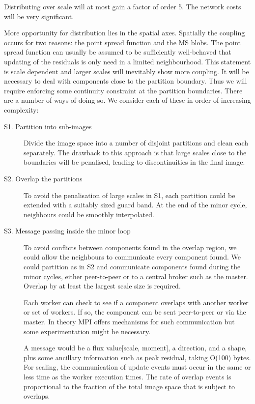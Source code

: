 \documentclass[11pt,a4paper,variablewidth]{article}
\begin{document}
Distributing over scale will at most gain a factor of order 5. The network costs will be very significant. 

More opportunity for distribution lies in the spatial axes. Spatially the coupling occurs for two reasons: the point spread function and the MS blobs. The point spread function can usually be assumed to be sufficiently well-behaved that updating of the residuals is only need in a limited neighbourhood. This statement is scale dependent and larger scales will inevitably show more coupling. It will be necessary to deal with components close to the partition boundary. Thus we will require enforcing some continuity constraint at the partition boundaries. There are a number of ways of doing so. We consider each of these in order of increasing complexity:

\begin{description}
\item[S1. Partition into sub-images]

Divide the image space into a number of disjoint partitions and clean each separately. The drawback to this approach is that large scales close to the boundaries will be penalised, leading to discontinuities in the final image.

\item[S2. Overlap the partitions]

To avoid the penalisation of large scales in S1, each partition could be extended with a suitably sized guard band. At the end of the minor cycle, neighbours could be smoothly interpolated. 

\item[S3. Message passing inside the minor loop]

To avoid conflicts between components found in the overlap region, we could allow the neighbours to communicate every component found. We could partition as in S2 and communicate components found during the minor cycles, either peer-to-peer or to a central broker such as the master. Overlap by at least the largest scale size is required.

Each worker can check to see if a component overlaps with another worker or set of workers. If so, the component can be sent peer-to-peer or via the master. In theory MPI offers mechanisms for such communication but some experimentation might be necessary.

A message would be a flux value[scale, moment], a direction, and a shape, plus some ancillary information such as peak residual, taking O(100) bytes. For scaling, the communication of update events must occur in the same or less time as the worker execution times. The rate of overlap events is proportional to the fraction of the total image space that is subject to overlaps.

\end{description}
\end{document}
